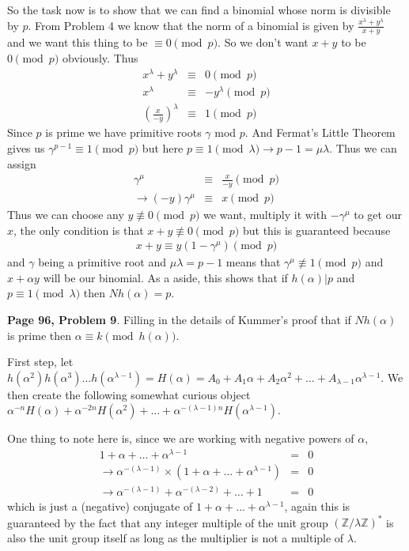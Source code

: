 \documentclass[aps,preprint,preprintnumbers,nofootinbib,showpacs,prd]{revtex4-1}
\newcommand{\nbea}{\begin{eqnarray*}}
\newcommand{\neea}{\end{eqnarray*}}
\begin{document}
So the task now is to show that we can find a binomial whose norm is divisible by $p$. From Problem 4 we know that the norm of a binomial is given by $\frac{x^\lambda + y^\lambda}{x + y}$ and we want this thing to be $\equiv 0 \pmod{p}$. So we don't want $x + y$ to be $0 \pmod{p}$ obviously. Thus
%
\nbea
x^\lambda + y^\lambda & \equiv & 0 \pmod{p} \\
x^\lambda & \equiv & -y^\lambda \pmod{p} \\
\left ( \frac{x}{-y} \right )^\lambda & \equiv & 1 \pmod{p}
\neea
%
Since $p$ is prime we have primitive roots $\gamma$ mod $p$. And Fermat's Little Theorem gives us $\gamma^{p-1} \equiv 1 \pmod{p}$ but here $p \equiv 1 \pmod{\lambda} \to p - 1 = \mu\lambda$. Thus we can assign
%
\nbea
\gamma^\mu & \equiv & \frac{x}{-y} \pmod{p} \\
\to (-y)\gamma^\mu & \equiv & x \pmod{p}
\neea
%
Thus we can choose any $y \not\equiv 0 \pmod{p}$ we want, multiply it with $-\gamma^\mu$ to get our $x$, the only condition is that $x + y \not\equiv 0 \pmod{p}$ but this is guaranteed because
%
\nbea
x + y \equiv y(1 - \gamma^\mu) \pmod{p}
\neea
%
and $\gamma$ being a primitive root and $\mu\lambda = p-1$ means that $\gamma^\mu \not\equiv 1 \pmod{p}$ and $x + \alpha y$ will be our binomial. As a aside, this shows that if $h(\alpha)|p$ and $p \equiv 1 \pmod{\lambda}$ then $Nh(\alpha) = p$.

{\bf Page 96, Problem 9}. Filling in the details of Kummer's proof that if $Nh(\alpha)$ is prime then $\alpha \equiv k \pmod{h(\alpha)}$.

First step, let $h(\alpha^2)h(\alpha^3) \dots h(\alpha^{\lambda-1}) = H(\alpha) = A_0 + A_1 \alpha + A_2 \alpha^2 + \dots + A_{\lambda - 1} \alpha^{\lambda-1}$. We then create the following somewhat curious object $\alpha^{-n}H(\alpha) + \alpha^{-2n}H(\alpha^2) + \dots + \alpha^{-(\lambda - 1)n}H(\alpha^{\lambda - 1})$.

One thing to note here is, since we are working with negative powers of $\alpha$,
%
\nbea
1 + \alpha + \dots + \alpha^{\lambda - 1} & = & 0 \\
\to \alpha^{-(\lambda-1)} \times (1 + \alpha + \dots + \alpha^{\lambda - 1}) & = & 0 \\
\to \alpha^{-(\lambda - 1)} + \alpha^{-(\lambda - 2)} + \dots + 1 & = & 0
\neea
%
which is just a (negative) conjugate of $1 + \alpha + \dots + \alpha^{\lambda - 1}$, again this is guaranteed by the fact that any integer multiple of the unit group $(\mathbb{Z}/\lambda\mathbb{Z})^*$ is also the unit group itself as long as the multiplier is not a multiple of $\lambda$.
\end{document}
